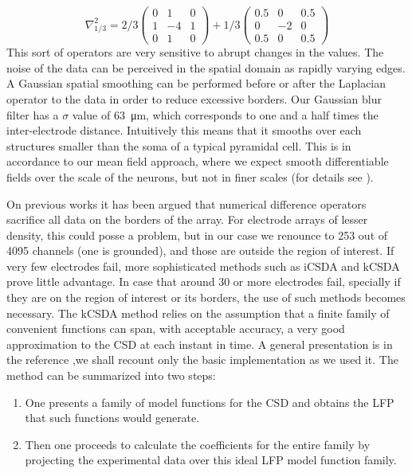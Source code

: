 \documentclass[11pt, letterpaper]{article}
\newcommand{\mum}[1]{\SI{#1}{\micro\metre}}
\begin{document}
\begin{equation}
\nabla^2_{1/3}=2/3
\begin{pmatrix}
  0 & 1 & 0 \\
  1 & -4 & 1 \\
  0 & 1 & 0
\end{pmatrix}
+1/3
\begin{pmatrix}
  0.5 & 0 & 0.5 \\
  0 & -2 & 0 \\
  0.5 & 0 & 0.5
\end{pmatrix}  
\end{equation}
This sort of operators are very sensitive to abrupt changes in the values.
The noise of the data can be perceived in the spatial domain as rapidly varying edges. A Gaussian spatial smoothing
can be performed before or after the Laplacian operator to the data in order to reduce excessive borders. Our Gaussian blur filter has a $ \sigma$ value of \mum{63}, which corresponds to one and a half times the inter-electrode distance.
Intuitively this means that it smooths over each structures smaller than the soma of a typical pyramidal cell. 
This is  in accordance to our mean field approach, where we expect smooth differentiable fields over the scale of the neurons, but not in finer scales (for details see \cite{Bedard11}).

On previous works it has been argued that numerical difference operators sacrifice all data on the borders of the array. For electrode arrays of lesser density, this could posse a problem, but in our case we renounce to 253 out of 4095 channels (one is grounded), and those are outside the region of interest.
If very few electrodes fail, more sophisticated methods such as iCSDA \cite{Leski2011} and kCSDA \cite{Potworowski2011} prove little advantage.
In case that around 30 or more electrodes
fail, specially if they are on the region of interest or its borders,
the use of such methods
becomes necessary. The kCSDA method relies on the
assumption that a finite family of convenient functions can span, with acceptable accuracy, a very good approximation to the  CSD at each instant in time.
A general presentation is in the reference \cite{Potworowski2011},we shall recount only the basic implementation as we used it. The
method can be summarized into two steps:
\begin{enumerate}
\item One presents a family of model functions for the CSD and
obtains the LFP that such functions
would generate.
\item Then one proceeds to calculate
  the coefficients for the entire family by projecting the
  experimental data over this ideal LFP model function family.
\end{enumerate}
\end{document}
